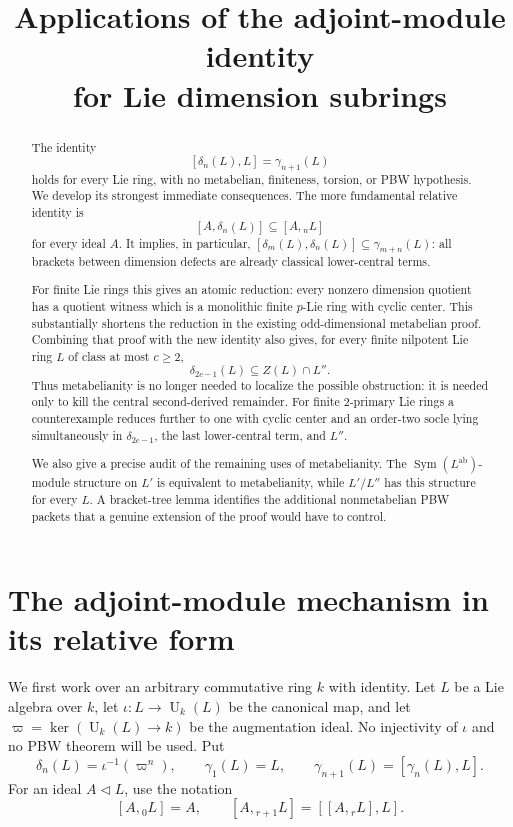 \documentclass[a4paper,11pt,reqno]{amsart}
\title[Applications of dimension centrality]
{Applications of the adjoint-module identity\\
for Lie dimension subrings}
\author{}
\date{}
\theoremstyle{definition}
\theoremstyle{remark}
\newcommand{\U}{\operatorname U}
\newcommand{\aug}{\varpi}
\newcommand{\dlt}{\delta}
\newcommand{\gm}{\gamma}
\newcommand{\Sym}{\operatorname{Sym}}
\newcommand{\ab}{\mathrm{ab}}
\begin{document}
\begin{abstract}
The identity
\[
                 [\dlt_n(L),L]=\gm_{n+1}(L)
\]
holds for every Lie ring, with no metabelian, finiteness, torsion, or PBW
hypothesis.  We develop its strongest immediate consequences.  The more
fundamental relative identity is
\[
 [A,\dlt_n(L)]\subseteq[A,{}_nL]
\]
for every ideal $A$.  It implies, in particular,
\([\dlt_m(L),\dlt_n(L)]\subseteq\gm_{m+n}(L)\): all brackets between
dimension defects are already classical lower-central terms.

For finite Lie rings this gives an atomic reduction: every nonzero dimension
quotient has a quotient witness which is a monolithic finite $p$-Lie ring with
cyclic center.  This substantially shortens the reduction in the existing
odd-dimensional metabelian proof.  Combining that proof with the new identity
also gives, for every finite nilpotent Lie ring $L$ of class at most $c\geq2$,
\[
                  \dlt_{2c-1}(L)\subseteq Z(L)\cap L''.
\]
Thus metabelianity is no longer needed to localize the possible obstruction: it
is needed only to kill the central second-derived remainder.  For finite
$2$-primary Lie rings a counterexample reduces further to one with cyclic
center and an order-two socle lying simultaneously in
\(\dlt_{2c-1}\), the last lower-central term, and $L''$.

We also give a precise audit of the remaining uses of metabelianity.  The
$\Sym(L^{\ab})$-module structure on $L'$ is equivalent to metabelianity, while
$L'/L''$ has this structure for every $L$.  A bracket-tree lemma identifies the
additional nonmetabelian PBW packets that a genuine extension of the proof
would have to control.
\end{abstract}

\maketitle

\section{The adjoint-module mechanism in its relative form}

We first work over an arbitrary commutative ring $k$ with identity.  Let $L$ be
a Lie algebra over $k$, let $\iota:L\to\U_k(L)$ be the canonical map, and let
$\aug=\ker(\U_k(L)\to k)$ be the augmentation ideal.  No injectivity of
$\iota$ and no PBW theorem will be used.  Put
\[
 \dlt_n(L)=\iota^{-1}(\aug^n),\qquad
 \gm_1(L)=L,\qquad \gm_{n+1}(L)=[\gm_n(L),L].
\]
For an ideal $A\lhd L$, use the notation
\[
 [A,{}_0L]=A,\qquad [A,{}_{r+1}L]=[[A,{}_rL],L].
\]
\end{document}
